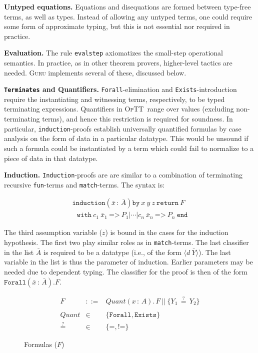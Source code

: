 \documentclass[preprint,natbib]{sigplanconf}
\newcommand{\optt}{\textsc{OpTT}}
\newcommand{\Eq}[0]{\texttt{=}}
\newcommand{\Neq}[0]{\texttt{!=}}
\newcommand{\Qeq}[0]{\stackrel{?}{=}}
\newcommand{\quant}[0]{\textit{Quant}}
\begin{document}
\textbf{Untyped equations.} Equations and disequations are formed
between type-free terms, as well as types.  Instead of allowing any
untyped terms, one could require some form of approximate typing, but
this is not essential nor required in practice.  

\textbf{Evaluation.} The rule \texttt{evalstep} axiomatizes the
small-step operational semantics.  In practice, as in other theorem
provers, higher-level tactics are needed.  \textsc{Guru} implements
several of these, discussed below.

\textbf{\texttt{Terminates} and Quantifiers.}
\texttt{Forall}-elimination and \texttt{Exists}-introduction require
the instantiating and witnessing terms, respectively, to be typed
terminating expressions.  Quantifiers in \optt\ range over values
(excluding non-terminating terms), and hence this restriction is
required for soundness.  In particular, \texttt{induction}-proofs
establish universally quantified formulas by case analysis on the form
of data in a particular datatype.  This would be unsound if such a
formula could be instantiated by a term which could fail to normalize
to a piece of data in that datatype.

\textbf{Induction.} \texttt{Induction}-proofs are are similar to a
combination of terminating recursive \texttt{fun}-terms and
\texttt{match}-terms.  The syntax is: 

\[
\begin{array}{l}
\texttt{induction}(\bar{x}\,:\,\bar{A})
\texttt{by}\ x\ y\ z\ \texttt{return}\ F\\
\ \ \ \texttt{with}\ c_1\ \bar{x}_1\ \texttt{=>}\ P_1 | 
 \cdots | c_n\ \bar{x}_n\ \texttt{=>}\ P_n\ \texttt{end}
\end{array}
\]

\noindent The third assumption variable ($z$) is bound in the cases
for the induction hypothesis.  The first two play similar roles as in
\texttt{match}-terms.  The last classifier in the list $\bar{A}$ is
required to be a datatype (i.e., of the form $\langle d\
\bar{Y}\rangle$).  The last variable in the list is thus the parameter
of induction.  Earlier parameters may be needed due to dependent
typing.  The classifier for the proof is then of the form
$\texttt{Forall}(\bar{x}\,:\,\bar{A}). F$.

\begin{figure}
\begin{eqnarray*}
F & ::= & \quant(x\,:\,A). \, F\ ||\  \{ Y_1\, \Qeq\, Y_2 \} \\ \\
\quant & \in & \{ \texttt{Forall}, \texttt{Exists} \} \\ 
\Qeq & \in & \{ \Eq, \Neq \} 
\end{eqnarray*}
\caption{\label{fig:formulas} Formulas ($F$) }
\end{figure}
\end{document}
